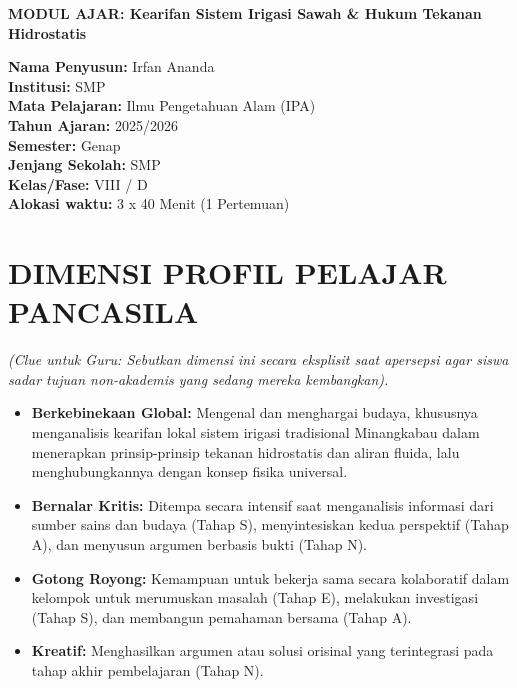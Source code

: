 \documentclass[12pt,a4paper]{article}
\begin{document}
\begin{center}
\textbf{\Large MODUL AJAR: Kearifan Sistem Irigasi Sawah \& Hukum Tekanan Hidrostatis}
\end{center}

\vspace{0.5cm}

\begin{tcolorbox}[mystyle]
\textbf{Nama Penyusun:} Irfan Ananda \\
\textbf{Institusi:} SMP \\
\textbf{Mata Pelajaran:} Ilmu Pengetahuan Alam (IPA) \\
\textbf{Tahun Ajaran:} 2025/2026 \\
\textbf{Semester:} Genap \\
\textbf{Jenjang Sekolah:} SMP \\
\textbf{Kelas/Fase:} VIII / D \\
\textbf{Alokasi waktu:} 3 x 40 Menit (1 Pertemuan)
\end{tcolorbox}

\section{DIMENSI PROFIL PELAJAR PANCASILA}
\textit{(Clue untuk Guru: Sebutkan dimensi ini secara eksplisit saat apersepsi agar siswa sadar tujuan non-akademis yang sedang mereka kembangkan).}

\begin{itemize}
\item \textbf{Berkebinekaan Global:} Mengenal dan menghargai budaya, khususnya menganalisis kearifan lokal sistem irigasi tradisional Minangkabau dalam menerapkan prinsip-prinsip tekanan hidrostatis dan aliran fluida, lalu menghubungkannya dengan konsep fisika universal.
\item \textbf{Bernalar Kritis:} Ditempa secara intensif saat menganalisis informasi dari sumber sains dan budaya (Tahap S), menyintesiskan kedua perspektif (Tahap A), dan menyusun argumen berbasis bukti (Tahap N).
\item \textbf{Gotong Royong:} Kemampuan untuk bekerja sama secara kolaboratif dalam kelompok untuk merumuskan masalah (Tahap E), melakukan investigasi (Tahap S), dan membangun pemahaman bersama (Tahap A).
\item \textbf{Kreatif:} Menghasilkan argumen atau solusi orisinal yang terintegrasi pada tahap akhir pembelajaran (Tahap N).
\end{itemize}
\end{document}
